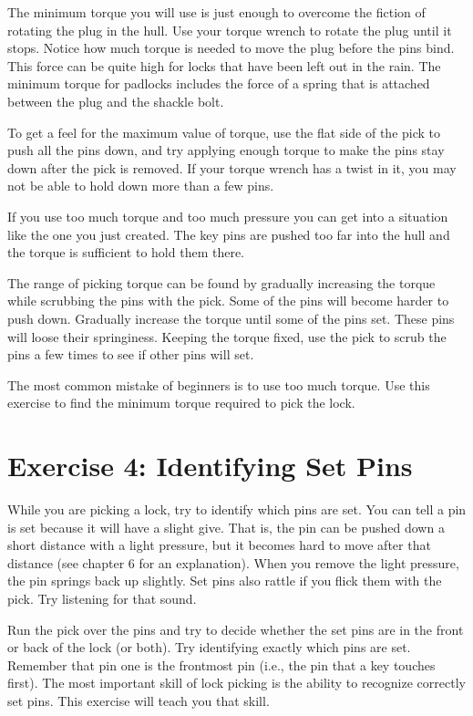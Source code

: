 The minimum torque you will use is just enough to overcome the fiction of rotating the
plug in the hull. Use your torque wrench to rotate the plug until it stops. Notice how much
torque is needed to move the plug before the pins bind. This force can be quite high for
locks that have been left out in the rain. The minimum torque for padlocks includes the
force of a spring that is attached between the plug and the shackle bolt.

To get a feel for the maximum value of torque, use the flat side of the pick to push all
the pins down, and try applying enough torque to make the pins stay down after the pick is
removed. If your torque wrench has a twist in it, you may not be able to hold down more
than a few pins.

If you use too much torque and too much pressure you can get into a situation like the
one you just created. The key pins are pushed too far into the hull and the torque is sufficient
to hold them there.

The range of picking torque can be found by gradually increasing the torque while scrubbing the pins with the pick.
Some of the pins will become harder to push down. Gradually
increase the torque until some of the pins set. These pins will loose their springiness.
Keeping the torque fixed, use the pick to scrub the pins a few times to see if other pins will
set.

The most common mistake of beginners is to use too much torque. Use this exercise to
find the minimum torque required to pick the lock.

\section{Exercise 4: Identifying Set Pins}
While you are picking a lock, try to identify which pins are set. You can tell a pin is set
because it will have a slight give. That is, the pin can be pushed down a short distance
with a light pressure, but it becomes hard to move after that distance (see chapter 6 for an
explanation). When you remove the light pressure, the pin springs back up slightly. Set pins
also rattle if you flick them with the pick. Try listening for that sound.

Run the pick over the pins and try to decide whether the set pins are in the front or back
of the lock (or both). Try identifying exactly which pins are set. Remember that pin one is
the frontmost pin (i.e., the pin that a key touches first). The most important skill of lock
picking is the ability to recognize correctly set pins. This exercise will teach you that skill.

